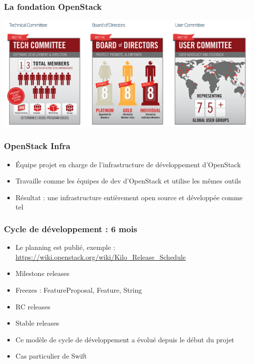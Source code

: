   \begin{frame}
    \frametitle{La fondation OpenStack}
      \includegraphics[width=\textwidth]{images/foundation.png}
  \end{frame}

  \begin{frame}
    \frametitle{OpenStack Infra}
    \begin{itemize}
      \item Équipe projet en charge de l'infrastructure de développement d'OpenStack
      \item Travaille comme les équipes de dev d'OpenStack et utilise les mêmes outils
      \item Résultat : une infrastructure entièrement open source et développée comme tel
    \end{itemize}
  \end{frame}

  \begin{frame}
    \frametitle{Cycle de développement : 6 mois}
    \begin{itemize}
      \item Le planning est publié, exemple : \url{https://wiki.openstack.org/wiki/Kilo_Release_Schedule}
      \item Milestone releases
      \item Freezes : FeatureProposal, Feature, String
      \item RC releases
      \item Stable releases
      \item Ce modèle de cycle de développement a évolué depuis le début du projet
      \item Cas particulier de Swift
    \end{itemize}
  \end{frame}

